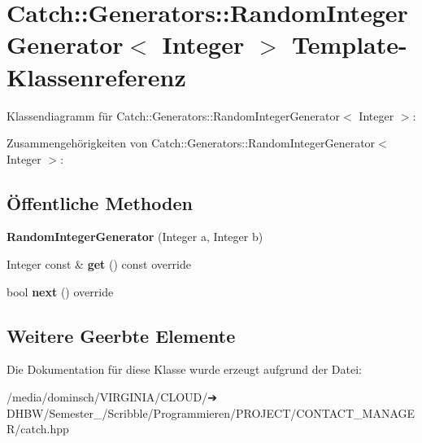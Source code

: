 \hypertarget{classCatch_1_1Generators_1_1RandomIntegerGenerator}{}\section{Catch\+:\+:Generators\+:\+:Random\+Integer\+Generator$<$ Integer $>$ Template-\/\+Klassenreferenz}
\label{classCatch_1_1Generators_1_1RandomIntegerGenerator}


Klassendiagramm für Catch\+:\+:Generators\+:\+:Random\+Integer\+Generator$<$ Integer $>$\+:


Zusammengehörigkeiten von Catch\+:\+:Generators\+:\+:Random\+Integer\+Generator$<$ Integer $>$\+:
\subsection*{Öffentliche Methoden}
\begin{DoxyCompactItemize}
\item 
\mbox{\label{classCatch_1_1Generators_1_1RandomIntegerGenerator_a886d16c899ad70781b83a0e8f9d2cf96}} 
{\bfseries Random\+Integer\+Generator} (Integer a, Integer b)
\item 
\mbox{\label{classCatch_1_1Generators_1_1RandomIntegerGenerator_aafbdf9028762f5e8f8ca9c317d686fca}} 
Integer const  \& {\bfseries get} () const override
\item 
\mbox{\label{classCatch_1_1Generators_1_1RandomIntegerGenerator_aaa3db70fbdfa3e8dcb61fb5592eba81f}} 
bool {\bfseries next} () override
\end{DoxyCompactItemize}
\subsection*{Weitere Geerbte Elemente}


Die Dokumentation für diese Klasse wurde erzeugt aufgrund der Datei\+:\begin{DoxyCompactItemize}
\item 
/media/dominsch/\+V\+I\+R\+G\+I\+N\+I\+A/\+C\+L\+O\+U\+D/➔ D\+H\+B\+W/\+Semester\+\_/\+Scribble/\+Programmieren/\+P\+R\+O\+J\+E\+C\+T/\+C\+O\+N\+T\+A\+C\+T\+\_\+\+M\+A\+N\+A\+G\+E\+R/catch.\+hpp\end{DoxyCompactItemize}
